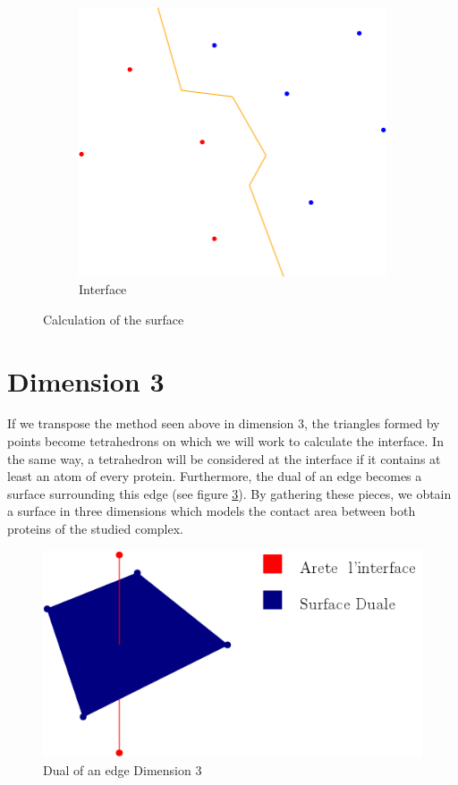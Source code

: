\begin{figure}[ht]
\begin{subfigure}{0.45\textwidth}
  \includegraphics[width=\textwidth]{figures/process_d_4.png}
  \caption{Interface}
  \label{fig::process_d_4}
\end{subfigure}
\caption{Calculation of the surface}
\label{fig::delaunays_process_2}
\end{figure}


\section{Dimension 3}

If we transpose the method seen above in dimension 3, the triangles formed
 by points become tetrahedrons on which we will work to calculate the interface.
  In the same way, a tetrahedron will be considered
at the interface if it contains at least an atom of every protein.
Furthermore, the dual of an edge becomes a surface surrounding this
 edge (see figure \ref{fig::dual_3d}). By gathering
  these pieces, we obtain a surface in three dimensions which models
  the contact area between both proteins of the studied complex.

\begin{figure}[ht]
\centering
  \includegraphics[width=\textwidth]{figures/dual_3d.png}
  \caption{Dual of an edge Dimension 3}
  \label{fig::dual_3d}
\end{figure}


